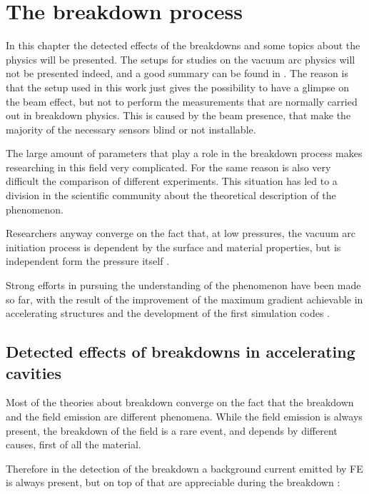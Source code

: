 \chapter[The breakdown process]{The breakdown process}

In this chapter the detected effects of the breakdowns and some topics about the physics will be presented. The setups for studies on the vacuum arc physics will not be presented indeed, and a good summary can be found in \cite{Kovermann:1330346}. The reason is that the setup used in this work just gives the possibility to have a glimpse on the beam effect, but not to perform the measurements that are normally carried out in breakdown physics. This is caused by the beam presence, that make the majority of the necessary sensors blind or not installable.

The large amount of parameters that play a role in the breakdown process makes researching in this field very complicated. For the same reason is also very difficult the comparison of different experiments. This situation has led to a division in the scientific community about the theoretical description of the phenomenon.

Researchers anyway converge on the fact that, at low pressures, the vacuum arc initiation process is dependent by the surface and material properties, but is independent form the pressure itself \cite{alpert:triggers}.

Strong efforts in pursuing the understanding of the phenomenon have been made so far, with the result of the improvement of the maximum gradient achievable in accelerating structures and the development of the first simulation codes \cite{Insepov:1373092}.



\section[Detected effects of breakdowns in accelerating cavities]{Detected effects of breakdowns in accelerating cavities}

Most of the theories about breakdown converge on the fact that the breakdown and the field emission are different phenomena. While the field emission is always present, the breakdown of the field is a rare event, and depends by different causes, first of all the material.

Therefore in the detection of the breakdown a background current emitted by FE is always present, but on top of that are appreciable during the breakdown \cite{Wuensch:583549}:

